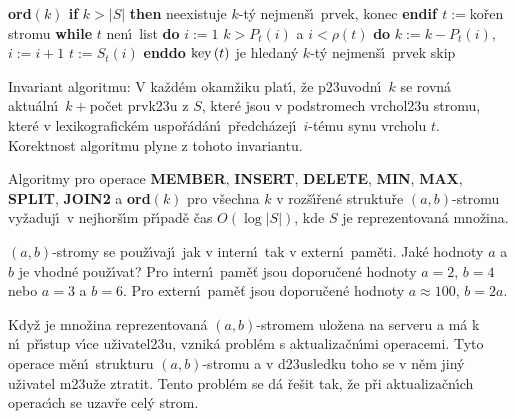 {\bf ord$\left(k\right)$\newline 
if} $k>|S|$ {\bf then} neexistuje $k$-t\'y nejmen\v s\'\i\ prvek, konec 
{\bf endif\newline 
$t:=$}ko\v ren stromu\newline 
{\bf while} $t$ nen\'\i\ list {\bf do}\newline 
\phantom{---}$i:=1$\newline 
\phantom{---}{\bf while} $k>P_t\left(i\right)$ a $i<\rho \left(t\right)$ {\bf do}\newline 
\phantom{------}$k:=k-P_t\left(i\right)$, $i:=i+1$\newline 
\phantom{---}{\bf enddo}\newline 
\phantom{---}$t:=S_t\left(i\right)$\newline 
{\bf enddo}\newline 
$\operatorname{key}\left(t\right)$ je hledan\'y $k$-t\'y nejmen\v s\'\i\ prvek
skip

\flushpar Invariant algoritmu: V ka\v zd\'em okam\v ziku plat\'\i , 
\v ze p\accent23uvodn\'\i\ $k$ se rovn\'a aktu\'aln\'\i\ $k+$po\v cet prvk\accent23u z 
$S$, kter\'e jsou v podstromech vrchol\accent23u stromu, kter\'e v 
lexikografick\'em uspo\v r\'ad\'an\'\i\ p\v redch\'azej\'\i\ $i$-t\'emu synu 
vrcholu $t$. Korektnost algoritmu plyne z tohoto 
invariantu.


Algoritmy pro operace {\bf MEMBER}, {\bf INSERT}, 
{\bf DE\-LETE}, {\bf MIN}, {\bf MAX}, {\bf SPLIT}, {\bf JOIN2} a {\bf ord$
\left(k\right)$} pro v\v sechna $k$ v 
roz\v s\'\i\v ren\'e struktu\v re $\left(a,b\right)$-stromu vy\-\v za\-duj\'\i\ v 
nejhor\v s\'\i m p\v r\'\i\-pa\-d\v e \v cas $O\left(\log|S|\right)$, kde $S$ je reprezentovan\'a 
mno\v zina.  
\endproclaim


\flushpar $\left(a,b\right)$-stromy se pou\v z\'\i vaj\'\i\ jak v intern\'\i\ tak v 
extern\'\i\ pam\v eti. Jak\'e hodnoty $a$ a $b$ je vhodn\'e 
pou\v z\'\i vat?\newline 
Pro intern\'\i\ pam\v e\v t jsou doporu\v cen\'e hodnoty $a=2$, $
b=4$ 
nebo $a=3$ a $b=6$.\newline 
Pro extern\'\i\ pam\v e\v t jsou doporu\v cen\'e hodnoty $a\approx 
100$, 
$b=2a$.
\medskip

\flushpar Kdy\v z je mno\v zina reprezentovan\'a $\left(a,b\right)$-stromem 
ulo\v zena na serveru a m\'a k n\'\i\ p\v r\'\i stup v\'\i ce 
u\v zivatel\accent23u, vznik\'a probl\'em s aktualiza\v cn\'\i mi 
operacemi. Tyto operace m\v en\'\i\ strukturu $\left(a,b\right)$-stromu a 
v d\accent23usledku toho se v n\v em jin\'y u\v zivatel 
m\accent23u\v ze ztratit. Tento probl\'em se d\'a  
\v re\v sit tak, \v ze p\v ri aktu\-aliza\v cn\'\i ch operac\'\i ch 
se uzav\v re cel\'y strom.
\medskip 

